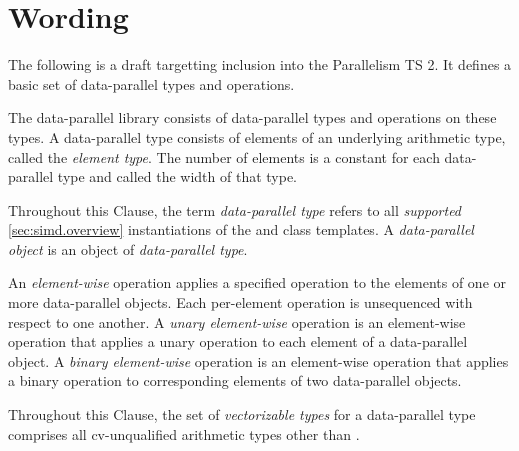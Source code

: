 \section{Wording}

The following is a draft targetting inclusion into the Parallelism TS 2.
It defines a basic set of data-parallel types and operations.

\newcommand\clause{Clause\xspace}
\newcommand\width{width\xspace}

\begin{wgText}
  \setcounter{WGClause}{7}
  \pnum
  The data-parallel library consists of data-parallel types and operations on these types.
  A data-parallel type consists of elements of an underlying arithmetic type, called the \emph{element type}.
  The number of elements is a constant for each data-parallel type and called the \width of that type.

  \pnum
  Throughout this \clause, the term \emph{data-parallel type} refers to all \emph{supported} \ref{sec:simd.overview} instantiations of the \simd and \mask class templates.
  A \emph{data-parallel object} is an object of \emph{data-parallel type}.

  \pnum
  An \emph{element-wise} operation applies a specified operation to the elements of one or more data-parallel objects.
  Each per-element operation is unsequenced with respect to one another.
  A \emph{unary element-wise} operation is an element-wise operation that applies a unary operation to each element of a data-parallel object.
  A \emph{binary element-wise} operation is an element-wise operation that applies a binary operation to corresponding elements of two data-parallel objects.

  \pnum Throughout this \clause, the set of \emph{vectorizable types} for a data-parallel type comprises all cv-unqualified arithmetic types other than \bool.

  \pnum

  
  
  
\end{wgText}

